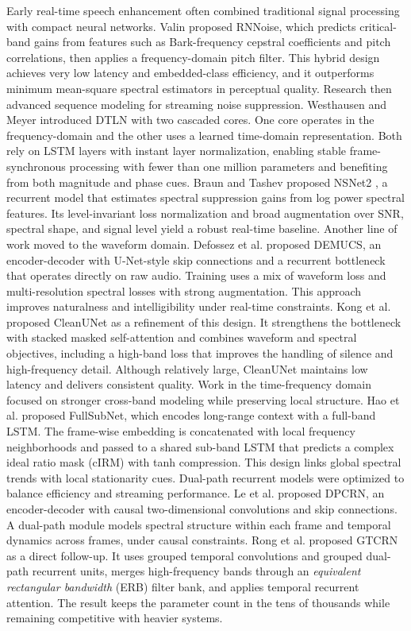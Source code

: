 \documentclass[final,5p,times,authoryear]{elsarticle}
\begin{document}
Early real-time speech enhancement often combined traditional signal processing with compact neural networks. Valin \citep{rnnoise} proposed RNNoise, which predicts critical-band gains from features such as Bark-frequency cepstral coefficients and pitch correlations, then applies a frequency-domain pitch filter. This hybrid design achieves very low latency and embedded-class efficiency, and it outperforms minimum mean-square spectral estimators in perceptual quality.
%
Research then advanced sequence modeling for streaming noise suppression. Westhausen and Meyer \citep{DTLN} introduced DTLN with two cascaded cores. One core operates in the frequency-domain and the other uses a learned time-domain representation. Both rely on LSTM layers with instant layer normalization, enabling stable frame-synchronous processing with fewer than one million parameters and benefiting from both magnitude and phase cues. Braun and Tashev proposed NSNet2 \citep{nsnet2}, a recurrent model that estimates spectral suppression gains from log power spectral features. Its level-invariant loss normalization and broad augmentation over SNR, spectral shape, and signal level yield a robust real-time baseline.
%
Another line of work moved to the waveform domain. Defossez et al. \citep{DEMUCS} proposed DEMUCS, an encoder-decoder with U-Net-style skip connections and a recurrent bottleneck that operates directly on raw audio. Training uses a mix of waveform loss and multi-resolution spectral losses with strong augmentation. This approach improves naturalness and intelligibility under real-time constraints. Kong et al. proposed CleanUNet \citep{CleanUNet} as a refinement of this design. It strengthens the bottleneck with stacked masked self-attention and combines waveform and spectral objectives, including a high-band loss that improves the handling of silence and high-frequency detail. Although relatively large, CleanUNet maintains low latency and delivers consistent quality.
%
Work in the time-frequency domain focused on stronger cross-band modeling while preserving local structure. Hao et al. \citep{Fullsubnet} proposed FullSubNet, which encodes long-range context with a full-band LSTM. The frame-wise embedding is concatenated with local frequency neighborhoods and passed to a shared sub-band LSTM that predicts a complex ideal ratio mask \citep{cIRM} (cIRM) with tanh compression. This design links global spectral trends with local stationarity cues.
%
Dual-path recurrent models were optimized to balance efficiency and streaming performance. Le et al. \citep{DPCRN} proposed DPCRN, an encoder-decoder with causal two-dimensional convolutions and skip connections. A dual-path module models spectral structure within each frame and temporal dynamics across frames, under causal constraints. Rong et al. proposed GTCRN \citep{GTCRN} as a direct follow-up. It uses grouped temporal convolutions and grouped dual-path recurrent units, merges high-frequency bands through an \textit{equivalent rectangular bandwidth} (ERB) filter bank, and applies temporal recurrent attention. The result keeps the parameter count in the tens of thousands while remaining competitive with heavier systems.
\end{document}
